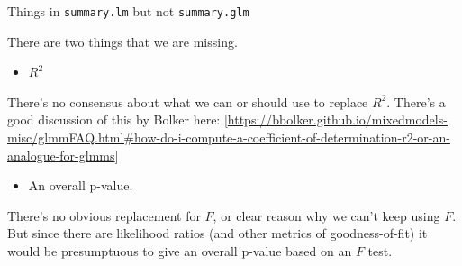 \documentclass[
  ignorenonframetext,
]{beamer}
\providecommand{\tightlist}{%
  \setlength{\itemsep}{0pt}\setlength{\parskip}{0pt}}
\begin{document}
\begin{frame}{Things in \texttt{summary.lm} but not
\texttt{summary.glm}}
\protect\hypertarget{things-in-summary.lm-but-not-summary.glm}{}

There are two things that we are missing.

\begin{itemize}
\tightlist
\item
  \(R^2\)
\end{itemize}

There's no consensus about what we can or should use to replace \(R^2\).
There's a good discussion of this by Bolker here:
{[}\url{https://bbolker.github.io/mixedmodels-misc/glmmFAQ.html\#how-do-i-compute-a-coefficient-of-determination-r2-or-an-analogue-for-glmms}{]}

\begin{itemize}
\tightlist
\item
  An overall p-value.
\end{itemize}

There's no obvious replacement for \(F\), or clear reason why we can't
keep using \(F\). But since there are likelihood ratios (and other
metrics of goodness-of-fit) it would be presumptuous to give an overall
p-value based on an \(F\) test.

\end{frame}
\end{document}
